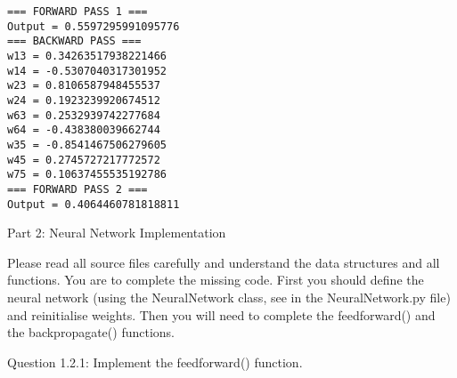 \documentclass[11pt]{article}
\begin{document}
    \begin{Verbatim}[commandchars=\\\{\}]
=== FORWARD PASS 1 ===
Output = 0.5597295991095776
=== BACKWARD PASS ===
w13 = 0.34263517938221466
w14 = -0.5307040317301952
w23 = 0.8106587948455537
w24 = 0.1923239920674512
w63 = 0.2532939742277684
w64 = -0.438380039662744
w35 = -0.8541467506279605
w45 = 0.2745727217772572
w75 = 0.10637455535192786
=== FORWARD PASS 2 ===
Output = 0.4064460781818811

    \end{Verbatim}

    Part 2: Neural Network Implementation

Please read all source files carefully and understand the data
structures and all functions. You are to complete the missing code.
First you should define the neural network (using the NeuralNetwork
class, see in the NeuralNetwork.py file) and reinitialise weights. Then
you will need to complete the feedforward() and the backpropagate()
functions.

Question 1.2.1: Implement the feedforward() function.
\end{document}
